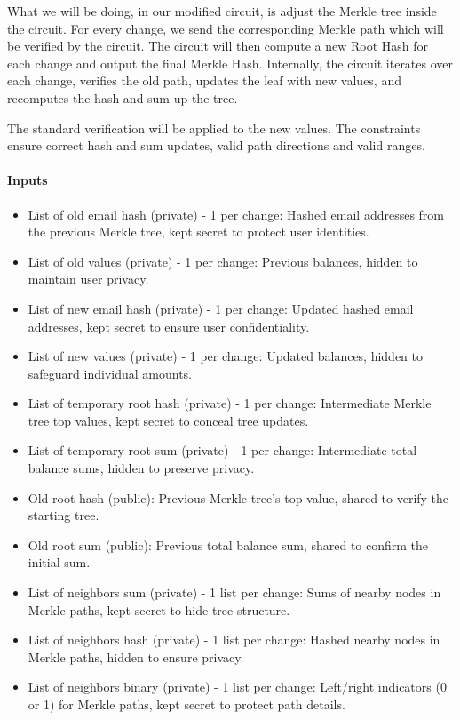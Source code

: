 What we will be doing, in our modified circuit, is adjust the Merkle tree inside the circuit.
For every change, we send the corresponding Merkle path which will be verified by the circuit.
The circuit will then compute a new Root Hash for each change and output the final Merkle Hash. 
Internally, the circuit iterates over each change, verifies the old path, updates the leaf with new values, and recomputes the hash and sum up the tree.

The standard verification will be applied to the new values.
The constraints ensure correct hash and sum updates, valid path directions and valid ranges.

\paragraph{Inputs}
\begin{itemize}
   \item List of old email hash (private) - 1 per change: Hashed email addresses from the previous Merkle tree, kept secret to protect user identities.
   \item List of old values (private) - 1 per change: Previous balances, hidden to maintain user privacy.
   \item List of new email hash (private) - 1 per change: Updated hashed email addresses, kept secret to ensure user confidentiality.
   \item List of new values (private) - 1 per change: Updated balances, hidden to safeguard individual amounts.
   \item List of temporary root hash (private) - 1 per change: Intermediate Merkle tree top values, kept secret to conceal tree updates.
   \item List of temporary root sum (private) - 1 per change: Intermediate total balance sums, hidden to preserve privacy.
   \item Old root hash (public): Previous Merkle tree's top value, shared to verify the starting tree.
   \item Old root sum (public): Previous total balance sum, shared to confirm the initial sum.
   \item List of neighbors sum (private) - 1 list per change: Sums of nearby nodes in Merkle paths, kept secret to hide tree structure.
   \item List of neighbors hash (private) - 1 list per change: Hashed nearby nodes in Merkle paths, hidden to ensure privacy.
   \item List of neighbors binary (private) - 1 list per change: Left/right indicators (0 or 1) for Merkle paths, kept secret to protect path details.
\end{itemize}

